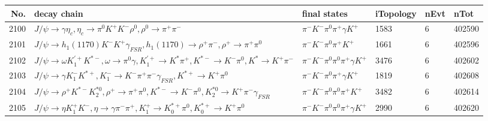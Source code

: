 \begin{table}[htbp] 
\begin{center}
\begin{small}
\begin{tabular}{rlllll}\hline\hline
 No. & decay chain & final states &  iTopology & nEvt & nTot \\\hline
2100&$J/\psi       \rightarrow \gamma       \eta_{c}    , \eta_{c}     \rightarrow \pi^{0}        K^{+}          K^{-}          \rho^{0}      , \rho^{0}       \rightarrow \pi^{+}        \pi^{-}        $&$\pi^{-}        K^{-}          \pi^{0}        \pi^{+}        \gamma       K^{+}          $& 1583&    6&402590\\
2101&$J/\psi       \rightarrow h_{1}(1170)    K^{-}          K^{+}          \gamma_{FSR} , h_{1}(1170)     \rightarrow \rho^{+}      \pi^{-}        , \rho^{+}       \rightarrow \pi^{+}        \pi^{0}        $&$\pi^{-}        K^{-}          \pi^{0}        \pi^{+}        K^{+}          $& 1661&    6&402596\\
2102&$J/\psi       \rightarrow \omega         K_1^{'+}      K^{*-}         , \omega          \rightarrow \pi^{0}        \gamma       , K_1^{'+}       \rightarrow K^{*}          \pi^{+}        , K^{*-}          \rightarrow K^{-}          \pi^{0}        , K^{*}           \rightarrow K^{+}          \pi^{-}        $&$\pi^{-}        K^{-}          \pi^{0}        \pi^{0}        \pi^{+}        \gamma       K^{+}          $& 3476&    6&402602\\
2103&$J/\psi       \rightarrow \gamma       K_{1}^{-}      K^{*+}         , K_{1}^{-}       \rightarrow K^{-}          \pi^{+}        \pi^{-}        \gamma_{FSR} , K^{*+}          \rightarrow K^{+}          \pi^{0}        $&$\pi^{-}        K^{-}          \pi^{0}        \pi^{+}        \gamma       K^{+}          $& 1819&    6&402608\\
2104&$J/\psi       \rightarrow \rho^{+}      K^{*-}         K_2^{*0}       , \rho^{+}       \rightarrow \pi^{+}        \pi^{0}        , K^{*-}          \rightarrow K^{-}          \pi^{0}        , K_2^{*0}        \rightarrow K^{+}          \pi^{-}        \gamma_{FSR} $&$\pi^{-}        K^{-}          \pi^{0}        \pi^{0}        \pi^{+}        K^{+}          $& 3482&    6&402614\\
2105&$J/\psi       \rightarrow \eta          K_1^{+}        K^{-}          , \eta           \rightarrow \gamma       \pi^{-}        \pi^{+}        , K_1^{+}         \rightarrow K_{0}^{*+}     \pi^{0}        , K_{0}^{*+}      \rightarrow K^{+}          \pi^{0}        $&$\pi^{-}        K^{-}          \pi^{0}        \pi^{0}        \pi^{+}        \gamma       K^{+}          $& 2990&    6&402620\\

\end{tabular}
\end{small}
\end{center}
\end{table}
